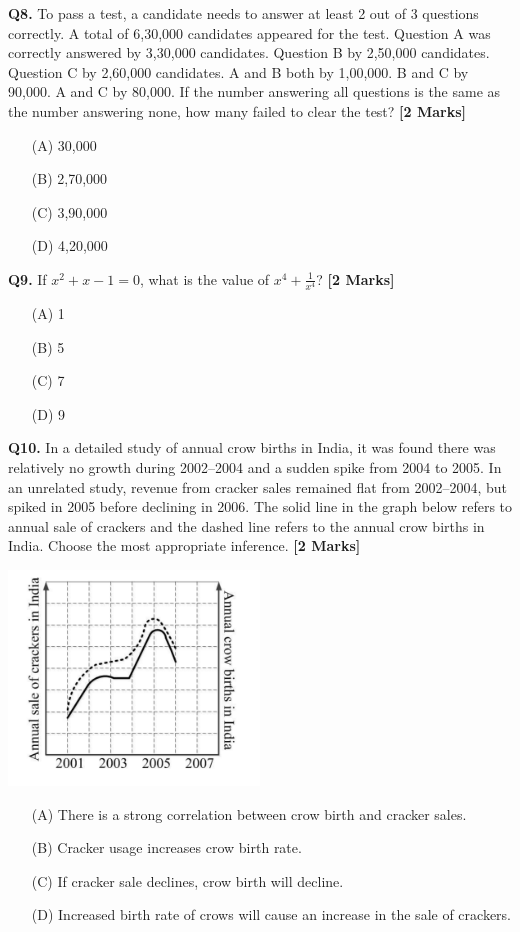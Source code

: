 \documentclass[11pt]{article}
\newcommand{\questionb}[2]{
    \noindent\textbf{Q#2.} #1 \hfill \textbf{[2 Marks]}
}
\begin{document}
\questionb{To pass a test, a candidate needs to answer at least 2 out of 3 questions correctly. A total of 6,30,000 candidates appeared for the test. Question A was correctly answered by 3,30,000 candidates. Question B by 2,50,000 candidates. Question C by 2,60,000 candidates. A and B both by 1,00,000. B and C by 90,000. A and C by 80,000. If the number answering all questions is the same as the number answering none, how many failed to clear the test?}{8}
\begin{enumerate}
    \item[(A)] 30,000  
    \item[(B)] 2,70,000  
    \item[(C)] 3,90,000  
    \item[(D)] 4,20,000  
\end{enumerate}
\vspace{0.5cm}

\questionb{If \(x^2 + x - 1 = 0\), what is the value of \(x^4 + \frac{1}{x^4}\)?}{9}
\begin{enumerate}
    \item[(A)] 1  
    \item[(B)] 5  
    \item[(C)] 7  
    \item[(D)] 9  
\end{enumerate}
\vspace{0.5cm}

\questionb{In a detailed study of annual crow births in India, it was found there was relatively no growth during 2002–2004 and a sudden spike from 2004 to 2005. In an unrelated study, revenue from cracker sales remained flat from 2002–2004, but spiked in 2005 before declining in 2006. The solid line in the graph below refers to annual sale of crackers and the dashed line refers to the annual crow births in India. Choose the most appropriate inference.}{10}
\begin{center}
\includegraphics[width=0.5\textwidth]{figures/10.png}
\end{center}
\begin{enumerate}
    \item[(A)] There is a strong correlation between crow birth and cracker sales.  
    \item[(B)] Cracker usage increases crow birth rate.  
    \item[(C)] If cracker sale declines, crow birth will decline.  
    \item[(D)] Increased birth rate of crows will cause an increase in the sale of crackers.  
\end{enumerate}
\vspace{0.5cm}
\end{document}
